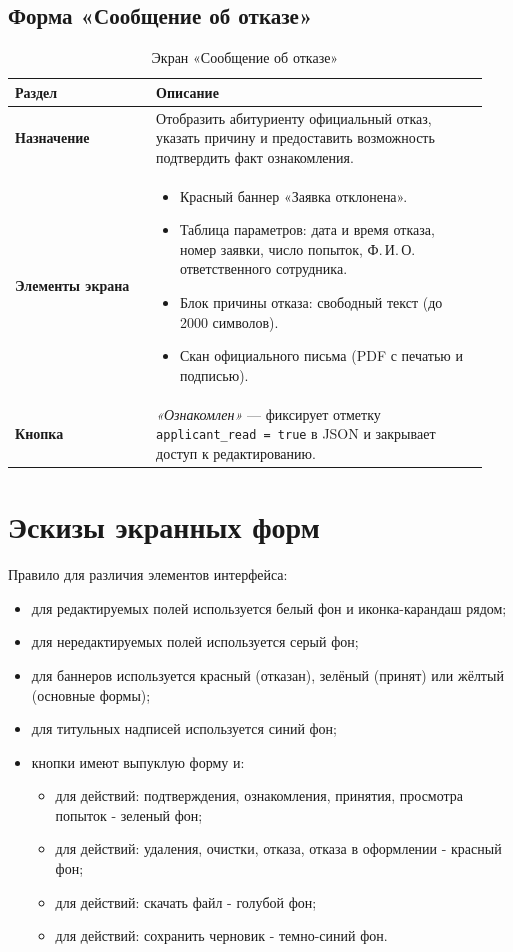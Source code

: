 \documentclass[areasetadvanced]{scrartcl}
\begin{document}
\subsection{Форма «Сообщение об отказе»}
\begin{table}[H]
\caption{Экран «Сообщение об отказе»}
\renewcommand{\arraystretch}{1.2}
\begin{tabular}{|p{0.28\linewidth}|p{0.66\linewidth}|}
\hline
\textbf{Раздел} & \textbf{Описание} \\ \hline
\textbf{Назначение} &
Отобразить абитуриенту официальный отказ, указать причину и предоставить возможность подтвердить факт ознакомления. \\ \hline

\textbf{Элементы экрана} &
\begin{itemize}
  \item Красный баннер «Заявка отклонена».
  \item Таблица параметров: дата и время отказа, номер заявки, число попыток, Ф.\,И.\,О. ответственного сотрудника.
  \item Блок причины отказа: свободный текст (до 2000 символов).
  \item Скан официального письма (PDF с печатью и подписью).
\end{itemize} \\ \hline

\textbf{Кнопка} &
\emph{«Ознакомлен»} — фиксирует отметку \texttt{applicant\_read = true} в JSON и закрывает доступ к редактированию. \\ \hline
\end{tabular}
\end{table}

\newpage
\section{Эскизы экранных форм}
Правило для различия элементов интерфейса:
\begin{itemize}
  \item для редактируемых полей используется белый фон и иконка-карандаш рядом;
  \item для нередактируемых полей используется серый фон;
  \item для баннеров используется красный (отказан), зелёный (принят) или жёлтый (основные формы);
  \item для титульных надписей используется синий фон;
  \item кнопки имеют выпуклую форму и: \begin{itemize}
    \item для действий: подтверждения, ознакомления, принятия, просмотра попыток - зеленый фон;
    \item для действий: удаления, очистки, отказа, отказа в оформлении - красный фон;
    \item для действий: скачать файл - голубой фон;
    \item для действий: сохранить черновик - темно-синий фон.
  \end{itemize}
\end{itemize}
\end{document}
